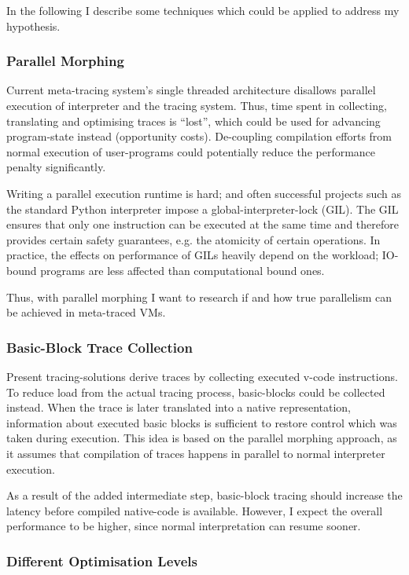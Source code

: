 In the following I describe some techniques which could be applied to address my
hypothesis.

\subsubsection{Parallel Morphing} Current meta-tracing system's single threaded
architecture disallows parallel execution of interpreter and the tracing system.
Thus, time spent in collecting, translating and optimising traces is ``lost'',
which could be used for advancing program-state instead (opportunity costs).
De-coupling compilation efforts from normal execution of user-programs could
potentially reduce the performance penalty significantly.

Writing a parallel execution runtime is hard; and often successful projects such
as the standard Python interpreter impose a global-interpreter-lock (GIL). The
GIL ensures that only one instruction can be executed at the same time and
therefore provides certain safety guarantees, e.g. the atomicity of certain
operations. In practice, the effects on performance of GILs heavily depend on
the workload; IO-bound programs are less affected than computational bound ones.

Thus, with parallel morphing I want to research if and how true parallelism can
be achieved in meta-traced VMs.

\subsubsection{Basic-Block Trace Collection} Present tracing-solutions derive
traces by collecting executed v-code instructions. To reduce load from the
actual tracing process, basic-blocks could be collected instead. When the trace
is later translated into a native representation, information about executed
basic blocks is sufficient to restore control which was taken during execution.
This idea is based on the parallel morphing approach, as it assumes that
compilation of traces happens in parallel to normal interpreter execution.

As a result of the added intermediate step, basic-block tracing should increase
the latency before compiled native-code is available. However, I expect the
overall performance to be higher, since normal interpretation can resume sooner.

\subsubsection{Different Optimisation Levels}


